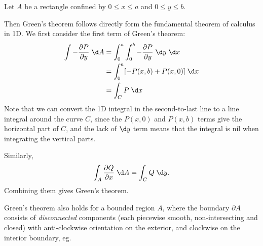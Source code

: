 \documentclass[a4paper]{article}
\begin{document}
\begin{eg}
  Let $A$ be a rectangle confined by $0 \leq x \leq a$ and $0 \leq y \leq b$.
  \begin{center}
  \end{center}

  Then Green's theorem follows directly form the fundamental theorem of calculus in 1D. We first consider the first term of Green's theorem:
  \begin{align*}
    \int -\frac{\partial P}{\partial y} \;\d A &= \int_0^a \int_0^b -\frac{\partial P}{\partial y}\;\d y\;\d x\\
    &= \int_0^a [-P(x, b) + P(x, 0)]\;\d x\\
    &= \int_C P\;\d x
  \end{align*}
  Note that we can convert the 1D integral in the second-to-last line to a line integral around the curve $C$, since the $P(x, 0)$ and $P(x, b)$ terms give the horizontal part of $C$, and the lack of $\d y$ term means that the integral is nil when integrating the vertical parts.
  
  Similarly,
  \[
    \int_A \frac{\partial Q}{\partial x}\;\d A = \int_C Q\;\d y.
  \]
  Combining them gives Green's theorem.
\end{eg}

Green's theorem also holds for a bounded region $A$, where the boundary $\partial A$ consists of \emph{disconnected} components (each piecewise smooth, non-intersecting and closed) with anti-clockwise orientation on the exterior, and clockwise on the interior boundary, eg.
\begin{center}
\end{center}
\end{document}
